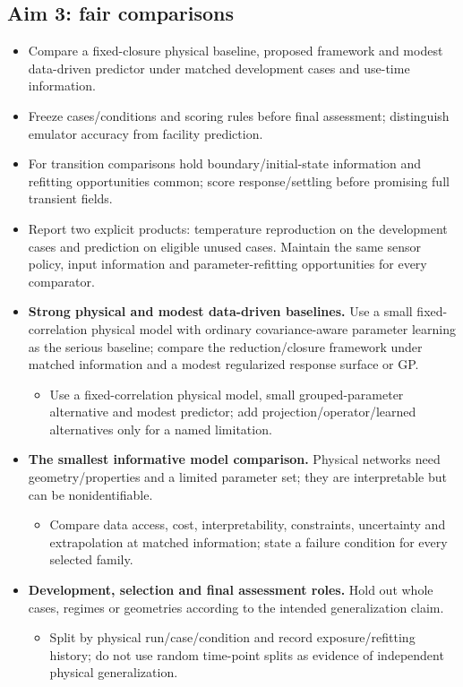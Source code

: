\subsection{Aim 3: fair comparisons}\label{subsec:aim-3-fair-comparisons}
\begin{itemize}[leftmargin=*]
\item Compare a fixed-closure physical baseline, proposed framework and modest data-driven predictor under matched development cases and use-time information.
\item Freeze cases/\allowbreak{}conditions and scoring rules before final assessment; distinguish emulator accuracy from facility prediction.
\item For transition comparisons hold boundary/\allowbreak{}initial-state information and refitting opportunities common; score response/\allowbreak{}settling before promising full transient fields.
\item Report two explicit products: temperature reproduction on the development cases and prediction on eligible unused cases. Maintain the same sensor policy, input information and parameter-refitting opportunities for every comparator.

\item {}\textbf{Strong physical and modest data-driven baselines.} Use a small fixed-correlation physical model with ordinary covariance-aware parameter learning as the serious baseline; compare the reduction/\allowbreak{}closure framework under matched information and a modest regularized response surface or GP.
\begin{itemize}
\item Use a fixed-correlation physical model, small grouped-parameter alternative and modest predictor; add projection/\allowbreak{}operator/\allowbreak{}learned alternatives only for a named limitation.
\end{itemize}
\item {}\textbf{The smallest informative model comparison.} Physical networks need geometry/\allowbreak{}properties and a limited parameter set; they are interpretable but can be nonidentifiable.
\begin{itemize}
\item Compare data access, cost, interpretability, constraints, uncertainty and extrapolation at matched information; state a failure condition for every selected family.
\end{itemize}
\item {}\textbf{Development, selection and final assessment roles.} Hold out whole cases, regimes or geometries according to the intended generalization claim.
\begin{itemize}
\item Split by physical run/\allowbreak{}case/\allowbreak{}condition and record exposure/\allowbreak{}refitting history; do not use random time-point splits as evidence of independent physical generalization.
\end{itemize}
\end{itemize}

